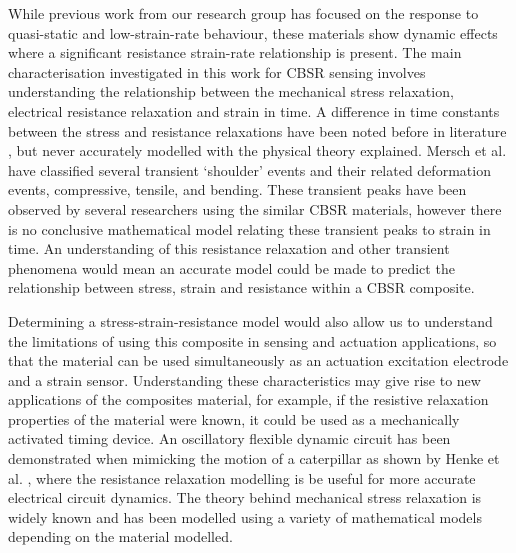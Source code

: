 While previous work from our research group \cite{Giffney2017,Devaraj2018} has focused on the response to quasi-static and low-strain-rate behaviour, these materials show dynamic effects where a significant resistance strain-rate relationship is present. The main characterisation investigated in this work for CBSR sensing involves understanding the relationship between the mechanical stress relaxation, electrical resistance relaxation and strain in time. A difference in time constants between the stress and resistance relaxations have been noted before in literature \cite{Kost1994,Wang2013,Maddipatla2017,Wang2004}, but never accurately modelled with the physical theory explained. Mersch et al. \cite{Mersch2020} have classified several transient `shoulder' events and their related deformation events, compressive, tensile, and bending. These transient peaks have been observed by several researchers using the similar CBSR materials, however there is no conclusive mathematical model relating these transient peaks to strain in time. An understanding of this resistance relaxation and other transient phenomena would mean an accurate model could be made to predict the relationship between stress, strain and resistance within a CBSR composite. 

Determining a stress-strain-resistance model would also allow us to understand the limitations of using this composite in sensing and actuation applications, so that the material can be used simultaneously as an actuation excitation electrode and a strain sensor. Understanding these characteristics may give rise to new applications of the composites material, for example, if the resistive relaxation properties of the material were known, it could be used as a mechanically activated timing device. An oscillatory flexible dynamic circuit has been demonstrated when mimicking the motion of a caterpillar as shown by Henke et al. \cite{Henke2018}, where the resistance relaxation modelling is be useful for more accurate electrical circuit dynamics. The theory behind mechanical stress relaxation is widely known and has been modelled using a variety of mathematical models \cite{Fung1993} depending on the material modelled. 

